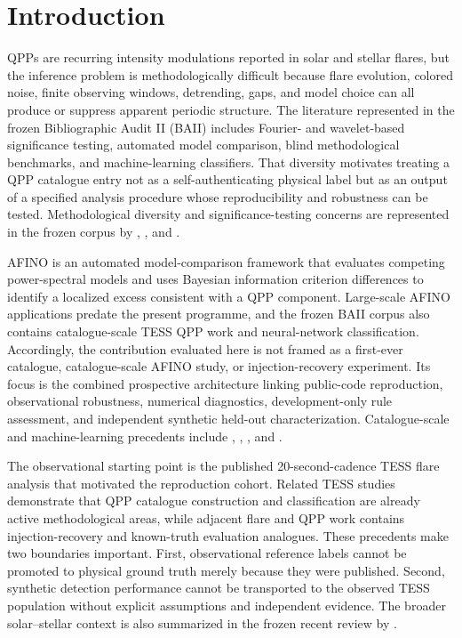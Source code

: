 \documentclass[manuscript,linenumbers]{aastex702}
\begin{document}
\section{Introduction}
QPPs are recurring intensity modulations reported in solar and stellar flares, but the inference problem is methodologically difficult because flare evolution, colored noise, finite observing windows, detrending, gaps, and model choice can all produce or suppress apparent periodic structure. The literature represented in the frozen Bibliographic Audit II (BAII) includes Fourier- and wavelet-based significance testing, automated model comparison, blind methodological benchmarks, and machine-learning classifiers. That diversity motivates treating a QPP catalogue entry not as a self-authenticating physical label but as an output of a specified analysis procedure whose reproducibility and robustness can be tested. Methodological diversity and significance-testing concerns are represented in the frozen corpus by \citet{Inglis2016}, \citet{Pugh2017}, and \citet{Broomhall2019}.

AFINO is an automated model-comparison framework that evaluates competing power-spectral models and uses Bayesian information criterion differences to identify a localized excess consistent with a QPP component. Large-scale AFINO applications predate the present programme, and the frozen BAII corpus also contains catalogue-scale TESS QPP work and neural-network classification. Accordingly, the contribution evaluated here is not framed as a first-ever catalogue, catalogue-scale AFINO study, or injection-recovery experiment. Its focus is the combined prospective architecture linking public-code reproduction, observational robustness, numerical diagnostics, development-only rule assessment, and independent synthetic held-out characterization. Catalogue-scale and machine-learning precedents include \citet{HowardMacGregor2022}, \citet{Belov2024}, \citet{Joshi2025}, and \citet{Wang2025}.

The observational starting point is the published 20-second-cadence TESS flare analysis that motivated the reproduction cohort. Related TESS studies demonstrate that QPP catalogue construction and classification are already active methodological areas, while adjacent flare and QPP work contains injection-recovery and known-truth evaluation analogues. These precedents make two boundaries important. First, observational reference labels cannot be promoted to physical ground truth merely because they were published. Second, synthetic detection performance cannot be transported to the observed TESS population without explicit assumptions and independent evidence. The broader solar--stellar context is also summarized in the frozen recent review by \citet{Reale2026}.
\end{document}
